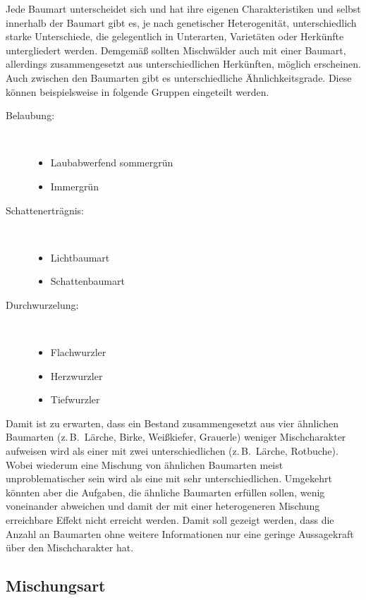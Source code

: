 \documentclass[twocolumn, paper=a4, fontsize=10pt, bibliography=totoc, index=totoc]{scrartcl}
\begin{document}
Jede Baumart unterscheidet sich und hat ihre eigenen Charakteristiken und selbst innerhalb der Baumart gibt es, je nach genetischer Heterogenität, unterschiedlich starke Unterschiede, die gelegentlich in Unterarten, Varietäten oder Herkünfte untergliedert werden. Demgemäß sollten Mischwälder auch mit einer Baumart, allerdings zusammengesetzt aus unterschiedlichen Herkünften, möglich erscheinen. Auch zwischen den Baumarten gibt es unterschiedliche Ähnlichkeitsgrade. Diese können beispielsweise in folgende Gruppen eingeteilt werden.

\begin{description}
  \item[Belaubung:] ~
  \begin{itemize}
    \item Laubabwerfend sommergrün
    \item Immergrün
  \end{itemize}
  \item[Schattenerträgnis:] ~
  \begin{itemize}
    \item Lichtbaumart
    \item Schattenbaumart
  \end{itemize}
  \item[Durchwurzelung:] ~
  \begin{itemize}
    \item Flachwurzler
    \item Herzwurzler
    \item Tiefwurzler
  \end{itemize}
\end{description}

Damit ist zu erwarten, dass ein Bestand zusammengesetzt aus vier ähnlichen
Baumarten (z.\,B.\ Lärche, Birke, Weißkiefer, Grauerle) weniger Mischcharakter
aufweisen wird als einer mit zwei unterschiedlichen (z.\,B.\ Lärche, Rotbuche).
Wobei wiederum eine Mischung von ähnlichen Baumarten meist unproblematischer
sein wird als eine mit sehr unterschiedlichen. Umgekehrt könnten aber die
Aufgaben, die ähnliche Baumarten erfüllen sollen, wenig voneinander abweichen
und damit der mit einer heterogeneren Mischung erreichbare Effekt nicht
erreicht werden. Damit soll gezeigt werden, dass die Anzahl an Baumarten ohne
weitere Informationen nur eine geringe Aussagekraft über den Mischcharakter hat.

\subsection{Mischungsart}
\label{ssec:mischugnsart}
\end{document}
